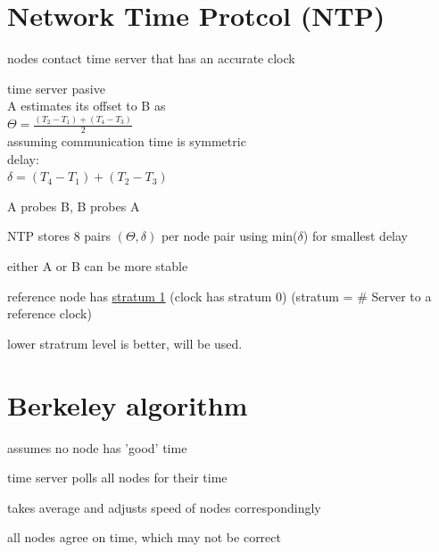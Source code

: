 \documentclass[ngerman,a4paper]{report}
\begin{document}
\section{Network Time Protcol (NTP)}
\begin{compactitem}
\item nodes contact time server that has an accurate clock
\item time server pasive\\
A estimates its offset to B as\\
$\Theta =  \frac{(T_2 - T_1) + (T_4 - T_3)}{2}$\\
assuming communication time is symmetric\\
delay:\\
$\delta = {(T_4 - T_1) + (T_2 - T_3)}$
\item A probes B, B probes A
\item NTP stores 8 pairs $(\Theta, \delta)$ per node pair using min($\delta$) for smallest delay
\item either A or B can be more stable
\item reference node has \underline{stratum  1} (clock has stratum 0) (stratum = \# Server to a reference clock)
\item lower stratrum level is better, will be used.
\end{compactitem}

\section{Berkeley algorithm}
\begin{compactitem}
\item assumes no node has 'good' time
\item time server polls all nodes for their time
\item takes average and adjusts speed of nodes correspondingly
\item all nodes agree on time, which may not be correct
\end{compactitem}
\end{document}
